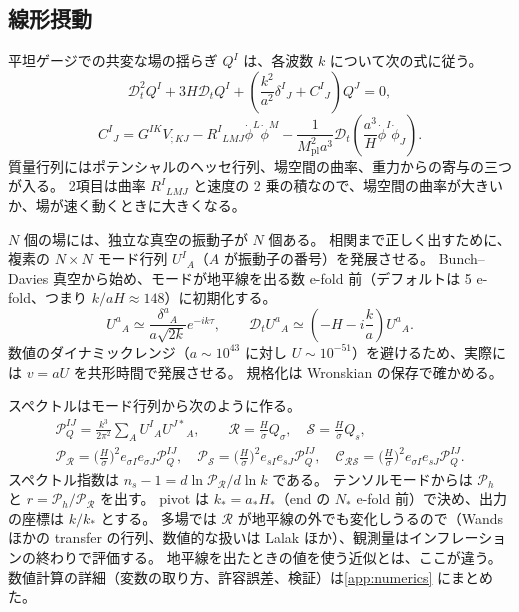 \documentclass[a4paper,11pt]{ltjsarticle}
\newcommand{\Mpl}{M_{\mathrm{pl}}}
\newcommand{\Dt}{\mathcal{D}_t}
\begin{document}
\subsection{線形摂動}

平坦ゲージでの共変な場の揺らぎ $Q^I$ は、各波数 $k$ について次の式に従う。
\begin{equation}
\Dt^2Q^I+3H\Dt Q^I+\left(\frac{k^2}{a^2}\delta^I{}_J+C^I{}_J\right)Q^J=0,
\label{eq:linear}
\end{equation}
\begin{equation}
C^I{}_J=G^{IK}V_{;KJ}-R^I{}_{LMJ}\dot\phi^L\dot\phi^M-\frac{1}{\Mpl^2a^3}\Dt\!\left(\frac{a^3}{H}\dot\phi^I\dot\phi_J\right).
\label{eq:mass}
\end{equation}
質量行列にはポテンシャルのヘッセ行列、場空間の曲率、重力からの寄与の三つが入る。
2項目は曲率 $R^I{}_{LMJ}$ と速度の 2 乗の積なので、場空間の曲率が大きいか、場が速く動くときに大きくなる。

$N$ 個の場には、独立な真空の振動子が $N$ 個ある。
相関まで正しく出すために、複素の $N\times N$ モード行列 $U^I{}_A$（$A$ が振動子の番号）を発展させる。
Bunch--Davies 真空から始め、モードが地平線を出る数 e-fold 前（デフォルトは 5 e-fold、つまり $k/aH\approx148$）に初期化する。
\[
U^a{}_A\simeq\frac{\delta^a{}_A}{a\sqrt{2k}}e^{-ik\tau},\qquad
\Dt U^a{}_A\simeq\left(-H-i\frac ka\right)U^a{}_A .
\]
数値のダイナミックレンジ（$a\sim10^{43}$ に対し $U\sim10^{-51}$）を避けるため、実際には $v=aU$ を共形時間で発展させる。
規格化は Wronskian の保存で確かめる。

スペクトルはモード行列から次のように作る。
\begin{gather}
\mathcal P_Q^{IJ}=\frac{k^3}{2\pi^2}\sum_AU^I{}_AU^{J*}{}_A,\qquad
\mathcal R=\frac{H}{\dot\sigma}Q_\sigma,\quad\mathcal S=\frac{H}{\dot\sigma}Q_s,\\
\mathcal P_{\mathcal R}=\Big(\frac H{\dot\sigma}\Big)^2e_{\sigma I}e_{\sigma J}\mathcal P_Q^{IJ},\quad
\mathcal P_{\mathcal S}=\Big(\frac H{\dot\sigma}\Big)^2e_{sI}e_{sJ}\mathcal P_Q^{IJ},\quad
\mathcal C_{\mathcal{RS}}=\Big(\frac H{\dot\sigma}\Big)^2e_{\sigma I}e_{sJ}\mathcal P_Q^{IJ}.
\end{gather}
スペクトル指数は $n_s-1=d\ln\mathcal P_{\mathcal R}/d\ln k$ である。
テンソルモードからは $\mathcal P_h$ と $r=\mathcal P_h/\mathcal P_{\mathcal R}$ を出す。
pivot は $k_*=a_*H_*$（end の $N_*$ e-fold 前）で決め、出力の座標は $k/k_*$ とする。
多場では $\mathcal R$ が地平線の外でも変化しうるので（Wands ほかの transfer の行列\cite{Wands2002}、数値的な扱いは Lalak ほか\cite{Lalak2007}）、観測量はインフレーションの終わりで評価する。
地平線を出たときの値を使う近似とは、ここが違う。
数値計算の詳細（変数の取り方、許容誤差、検証）は\ref{app:numerics} にまとめた。
\end{document}
